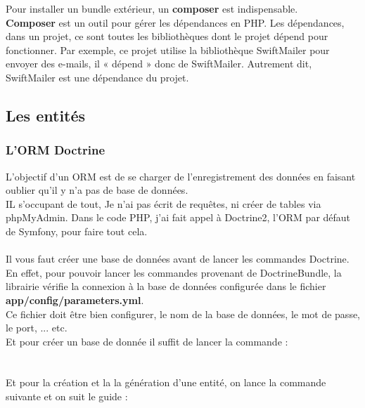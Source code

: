 \documentclass[12pt]{article}
\begin{document}
Pour installer un bundle extérieur, un \textbf{composer} est indispensable.\\
\textbf{Composer} est un outil pour gérer les dépendances en PHP. Les dépendances, dans un projet, ce sont toutes les bibliothèques dont le projet dépend pour fonctionner. Par exemple, ce  projet utilise la bibliothèque SwiftMailer pour envoyer des e-mails, il « dépend » donc de SwiftMailer. Autrement dit, SwiftMailer est une dépendance du projet.\\



\subsection{Les entités }

\subsubsection{L'ORM Doctrine}
L'objectif d'un ORM  est de se charger de l'enregistrement des  données en  faisant oublier qu'il y n'a pas de base de données. \\
IL s'occupant de tout, Je n'ai pas écrit de requêtes, ni créer de tables via phpMyAdmin. Dans le code PHP, j'ai  fait appel à Doctrine2, l'ORM par défaut de Symfony, pour faire tout cela.\\ \\

Il vous faut créer une base de données avant de lancer les commandes Doctrine.\\
 En effet, pour pouvoir lancer les commandes provenant de DoctrineBundle, la librairie vérifie la connexion à la base de données configurée dans le fichier \textbf{ app/config/parameters.yml}. \\
 Ce fichier doit être bien configurer, le nom de la base de données, le mot de passe, le port, ... etc.\\
 Et pour créer un base de donnée il suffit de lancer la commande :\\
 \\
 \\
 Et pour la création et la la génération d'une entité, on lance la commande suivante et on suit le guide :\\
 \\
 
\\ 
\end{document}
